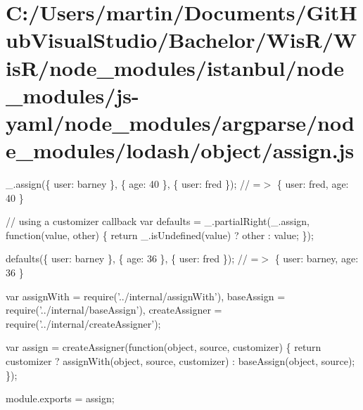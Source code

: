 \hypertarget{_c_1_2_users_2martin_2_documents_2_git_hub_visual_studio_2_bachelor_2_wis_r_2_wis_r_2node_module1c848bede40d3b853decb8d13fba72dc}{}\section{C\+:/\+Users/martin/\+Documents/\+Git\+Hub\+Visual\+Studio/\+Bachelor/\+Wis\+R/\+Wis\+R/node\+\_\+modules/istanbul/node\+\_\+modules/js-\/yaml/node\+\_\+modules/argparse/node\+\_\+modules/lodash/object/assign.\+js}
\+\_\+.\+assign(\{ \textquotesingle{}user\textquotesingle{}\+: \textquotesingle{}barney\textquotesingle{} \}, \{ \textquotesingle{}age\textquotesingle{}\+: 40 \}, \{ \textquotesingle{}user\textquotesingle{}\+: \textquotesingle{}fred\textquotesingle{} \}); // =$>$ \{ \textquotesingle{}user\textquotesingle{}\+: \textquotesingle{}fred\textquotesingle{}, \textquotesingle{}age\textquotesingle{}\+: 40 \}

// using a customizer callback var defaults = \+\_\+.\+partial\+Right(\+\_\+.\+assign, function(value, other) \{ return \+\_\+.\+is\+Undefined(value) ? other \+: value; \});

defaults(\{ \textquotesingle{}user\textquotesingle{}\+: \textquotesingle{}barney\textquotesingle{} \}, \{ \textquotesingle{}age\textquotesingle{}\+: 36 \}, \{ \textquotesingle{}user\textquotesingle{}\+: \textquotesingle{}fred\textquotesingle{} \}); // =$>$ \{ \textquotesingle{}user\textquotesingle{}\+: \textquotesingle{}barney\textquotesingle{}, \textquotesingle{}age\textquotesingle{}\+: 36 \}


\begin{DoxyCodeInclude}
var assignWith = require(\textcolor{stringliteral}{'../internal/assignWith'}),
    baseAssign = require(\textcolor{stringliteral}{'../internal/baseAssign'}),
    createAssigner = require(\textcolor{stringliteral}{'../internal/createAssigner'});

var assign = createAssigner(\textcolor{keyword}{function}(\textcolor{keywordtype}{object}, source, customizer) \{
  \textcolor{keywordflow}{return} customizer
    ? assignWith(\textcolor{keywordtype}{object}, source, customizer)
    : baseAssign(object, source);
\});

module.exports = assign;
\end{DoxyCodeInclude}
 